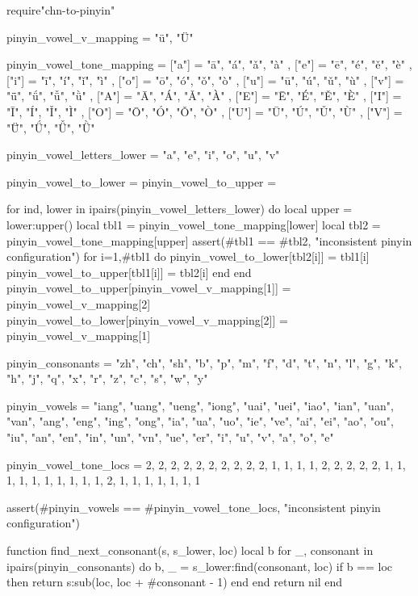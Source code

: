 \begin{luacode*}
require"chn-to-pinyin"

pinyin_vowel_v_mapping = {
    "ü", "Ü"
}

pinyin_vowel_tone_mapping = {
    ["a"] = {
        "ā", "á", "ǎ", "à"
    },
    ["e"] = {
        "ē", "é", "ě", "è"
    },
    ["i"] = {
        "ī", "í", "ǐ", "ì"
    },
    ["o"] = {
        "ō", "ó", "ǒ", "ò"
    },
    ["u"] = {
        "ū", "ú", "ǔ", "ù"
    },
    ["v"] = {
        "ǖ", "ǘ", "ǚ", "ǜ"
    },
    ["A"] = {
        "Ā", "Á", "Ǎ", "À"
    },
    ["E"] = {
        "Ē", "É", "Ě", "È"
    },
    ["I"] = {
        "Ī", "Í", "Ǐ", "Ì"
    },
    ["O"] = {
        "Ō", "Ó", "Ǒ", "Ò"
    },
    ["U"] = {
        "Ū", "Ú", "Ǔ", "Ù"
    },
    ["V"] = {
        "Ǖ", "Ǘ", "Ǚ", "Ǜ"
    }
}

pinyin_vowel_letters_lower = {"a", "e", "i", "o", "u", "v"}

pinyin_vowel_to_lower = {}
pinyin_vowel_to_upper = {}

for ind, lower in ipairs(pinyin_vowel_letters_lower) do
    local upper = lower:upper()
    local tbl1 = pinyin_vowel_tone_mapping[lower]
    local tbl2 = pinyin_vowel_tone_mapping[upper]
    assert(#tbl1 == #tbl2, "inconsistent pinyin configuration")
    for i=1,#tbl1 do
        pinyin_vowel_to_lower[tbl2[i]] = tbl1[i]
        pinyin_vowel_to_upper[tbl1[i]] = tbl2[i]
    end
end
pinyin_vowel_to_upper[pinyin_vowel_v_mapping[1]] = pinyin_vowel_v_mapping[2]
pinyin_vowel_to_lower[pinyin_vowel_v_mapping[2]] = pinyin_vowel_v_mapping[1]

pinyin_consonants = {
    "zh", "ch", "sh", "b", "p", "m", "f", "d",
    "t", "n", "l", "g", "k", "h", "j", "q", "x",
    "r", "z", "c", "s", "w", "y"
}

pinyin_vowels = {
    "iang", "uang", "ueng", "iong", "uai", "uei", "iao", "ian",
    "uan", "van", "ang", "eng", "ing", "ong", "ia", "ua", "uo",
    "ie", "ve", "ai", "ei", "ao", "ou", "iu", "an", "en", "in",
    "un", "vn", "ue", "er", "i", "u", "v", "a", "o", "e"
}

pinyin_vowel_tone_locs = {
    2, 2, 2, 2, 2, 2, 2, 2, 2, 2, 1, 1, 1, 1, 2, 2, 2, 2, 2,
    1, 1, 1, 1, 1, 1, 1, 1, 1, 1, 2, 1, 1, 1, 1, 1, 1, 1
}

assert(#pinyin_vowels == #pinyin_vowel_tone_locs, "inconsistent pinyin configuration")

function find_next_consonant(s, s_lower, loc)
    local b
    for _, consonant in ipairs(pinyin_consonants) do
        b, _ = s_lower:find(consonant, loc)
        if b == loc then
            return s:sub(loc, loc + #consonant - 1)
        end
    end
    return nil
end


\end{luacode*}
